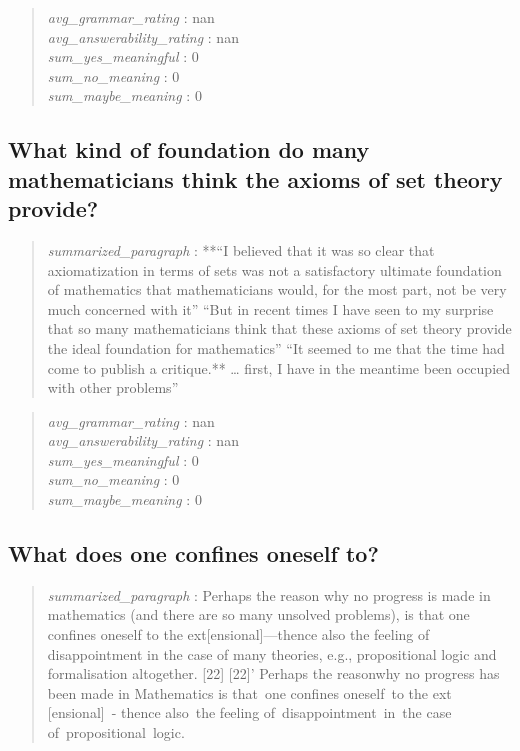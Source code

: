 \begin{quote}
\emph{avg\_grammar\_rating} : nan\\
\emph{avg\_answerability\_rating} : nan\\
\emph{sum\_yes\_meaningful} : 0\\
\emph{sum\_no\_meaning} : 0\\
\emph{sum\_maybe\_meaning} : 0
\end{quote}

\hypertarget{what-kind-of-foundation-do-many-mathematicians-think-the-axioms-of-set-theory-provide}{%
\subsection{What kind of foundation do many mathematicians think the
axioms of set theory
provide?}\label{what-kind-of-foundation-do-many-mathematicians-think-the-axioms-of-set-theory-provide}}

\begin{quote}
\emph{summarized\_paragraph} : **``I believed that it was so clear that
axiomatization in terms of sets was not a satisfactory ultimate
foundation of mathematics that mathematicians would, for the most part,
not be very much concerned with it'' ``But in recent times I have seen
to my surprise that so many mathematicians think that these axioms of
set theory provide the ideal foundation for mathematics'' ``It seemed to
me that the time had come to publish a critique.** \ldots{} first, I
have in the meantime been occupied with other problems''
\end{quote}

\begin{quote}
\emph{avg\_grammar\_rating} : nan\\
\emph{avg\_answerability\_rating} : nan\\
\emph{sum\_yes\_meaningful} : 0\\
\emph{sum\_no\_meaning} : 0\\
\emph{sum\_maybe\_meaning} : 0
\end{quote}

\hypertarget{what-does-one-confines-oneself-to}{%
\subsection{What does one confines oneself
to?}\label{what-does-one-confines-oneself-to}}

\begin{quote}
\emph{summarized\_paragraph} : Perhaps the reason why no progress is
made in mathematics (and there are so many unsolved problems), is that
one confines oneself to the ext{[}ensional{]}---thence also the feeling
of disappointment in the case of many theories, e.g., propositional
logic and formalisation altogether. {[}22{]} {[}22{]}' Perhaps the
reasonwhy no progress has been made in Mathematics is that~one confines
oneself~to the ext {[}ensional{]}~- thence also~the feeling
of~disappointment~in~the case of~propositional~logic.
\end{quote}

